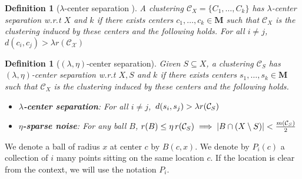 \documentclass[12pt]{article}
\newtheorem{definition}[theorem]{Definition}
\newcommand{\mc}{\mathcal}
\newcommand{\mb}{\mathbf}
\begin{document}
\begin{definition}[$\lambda$-center separation \cite{ben2014clustering}]
\label{defn:lambdacs}
A clustering $\mc C_{X} = \{C_1, \ldots, C_k\}$ has $\lambda$-center separation w.r.t $X$ and $k$ if there exists centers $c_1, \ldots, c_k \in \mb M$ such that $\mc C_{X}$ is the clustering induced by these centers and the following holds. For all $i\neq j$, $d(c_i, c_j) > \lambda r(\mc{C}_{\mc{X}})$
\end{definition}

\begin{definition}[$(\lambda, \eta)$-center separation]
Given $S \subseteq X$, a clustering $\mc C_{S}$ has $(\lambda, \eta)$-center separation w.r.t $X, S$ and $k$ if there exists centers $s_1, \ldots, s_k \in \mb M$ such that $\mc C_{X}$ is the clustering induced by these centers and the following holds.

\begin{itemize}[nolistsep, noitemsep]
\label{defn:lambdacsnoise}	

\item[$\diamond$] {\bf $\lambda$-center separation}: For all $i\neq j$, $\thinspace d(s_i, s_j) > \lambda r({\mc C}_{S})$
\item[$\diamond$]{\bf $\eta$-sparse noise}: For any ball $B$, $r(B)\leq \eta \thinspace r(\mc{C}_{S}) \implies |B\cap (X\setminus S)| < \frac{m(\mc C_{S})}{2}$
\end{itemize}
\end{definition}

We denote a ball of radius $x$ at center $c$ by $B(c, x)$. We denote by $P_{i}(c)$ a collection of $i$ many points sitting on the same location $c$. If the location is clear from the context, we will use the notation $P_i$.

\end{document}
